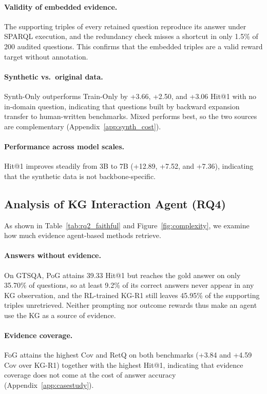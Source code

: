 \paragraph{Validity of embedded evidence.}
The supporting triples of every retained question reproduce its answer under SPARQL execution, and the redundancy check misses a shortcut in only 1.5\% of 200 audited questions. This confirms that the embedded triples are a valid reward target without annotation.




\paragraph{Synthetic vs.\ original data.}
Synth-Only outperforms Train-Only by +3.66, +2.50, and +3.06 Hit@1 with no in-domain question, indicating that questions built by backward expansion transfer to human-written benchmarks. Mixed performs best, so the two sources are complementary (Appendix~\ref{app:synth_cost}).

\paragraph{Performance across model scales.}
Hit@1 improves steadily from 3B to 7B (+12.89, +7.52, and +7.36), indicating that the synthetic data is not backbone-specific.

\subsection{Analysis of KG Interaction Agent (RQ4)}
\label{sec:rq4}

As shown in Table~\ref{tab:rq2_faithful} and Figure~\ref{fig:complexity}, we examine how much evidence agent-based methods retrieve.

\paragraph{Answers without evidence.}
On GTSQA, PoG attains 39.33 Hit@1 but reaches the gold answer on only 35.70\% of questions, so at least 9.2\% of its correct answers never appear in any KG observation, and the RL-trained KG-R1 still leaves 45.95\% of the supporting triples unretrieved. Neither prompting nor outcome rewards thus make an agent use the KG as a source of evidence.

\paragraph{Evidence coverage.}
FoG attains the highest Cov and RetQ on both benchmarks (+3.84 and +4.59 Cov over KG-R1) together with the highest Hit@1, indicating that evidence coverage does not come at the cost of answer accuracy (Appendix~\ref{app:casestudy}).

